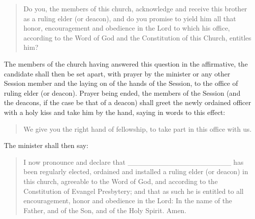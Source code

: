 \documentclass[
]{book}
\begin{document}
\begin{enumerate}
  \begin{quote}
  Do you, the members of this church, acknowledge and receive this brother as a ruling elder (or deacon), and do you promise to yield him all that honor, encouragement and obedience in the Lord to which his office, according to the Word of God and the Constitution of this Church, entitles him?
  \end{quote}

  The members of the church having answered this question in the affirmative, the candidate shall then be set apart, with prayer by the minister or any other Session member and the laying on of the hands of the Session, to the office of ruling elder (or deacon). Prayer being ended, the members of the Session (and the deacons, if the case be that of a deacon) shall greet the newly ordained officer with a holy kiss and take him by the hand, saying in words to this effect:

  \begin{quote}
  We give you the right hand of fellowship, to take part in this office with us.
  \end{quote}

  The minister shall then say:

  \begin{quote}
  I now pronounce and declare that \_\_\_\_\_\_\_\_\_\_\_\_\_\_\_\_\_\_\_\_ has been regularly elected, ordained and installed a ruling elder (or deacon) in this church, agreeable to the Word of God, and according to the Constitution of Evangel Presbytery; and that as such he is entitled to all encouragement, honor and obedience in the Lord: In the name of the Father, and of the Son, and of the Holy Spirit. Amen.
  \end{quote}


\end{enumerate}
\end{document}
